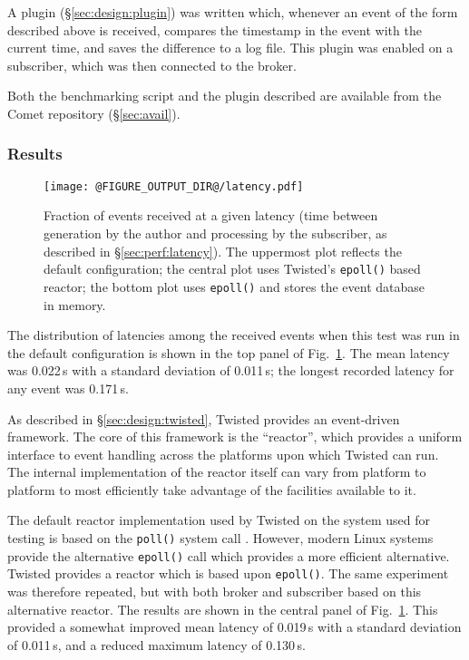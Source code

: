 \documentclass[5p,authoryear]{elsarticle}
\begin{document}
A plugin (\S\ref{sec:design:plugin}) was written which, whenever an event of
the form described above is received, compares the timestamp in the event with
the current time, and saves the difference to a log file. This plugin was
enabled on a subscriber, which was then connected to the broker.

Both the benchmarking script and the plugin described are available from the
Comet repository (\S\ref{sec:avail}).

\subsubsection{Results}
\label{sec:perf:latency:results}

\begin{figure}
  \begin{center}
  \texttt{[image: @FIGURE\_OUTPUT\_DIR@/latency.pdf]}
  \end{center}

  \caption{Fraction of events received at a given latency (time between
  generation by the author and processing by the subscriber, as described in
  \S\ref{sec:perf:latency}). The uppermost plot reflects the default
  configuration; the central plot uses Twisted's \texttt{epoll()} based
  reactor; the bottom plot uses \texttt{epoll()} and stores the event database
  in memory.}

  \label{fig:latency}
\end{figure}

The distribution of latencies among the received events when this test was run
in the default configuration is shown in the top panel of
Fig.~\ref{fig:latency}. The mean latency was 0.022\,s with a standard
deviation of 0.011\,s; the longest recorded latency for any event was
0.171\,s.

As described in \S\ref{sec:design:twisted}, Twisted provides an event-driven
framework. The core of this framework is the ``reactor'', which provides a
uniform interface to event handling across the platforms upon which Twisted
can run. The internal implementation of the reactor itself can vary from
platform to platform to most efficiently take advantage of the facilities
available to it.

The default reactor implementation used by Twisted on the system used for
testing is based on the \texttt{poll()} system call \citep{Posix1:2013}.
However, modern Linux systems provide the alternative \texttt{epoll()} call
\citep{Kerrisk:2014} which provides a more efficient alternative. Twisted
provides a reactor which is based upon \texttt{epoll()}. The same experiment
was therefore repeated, but with both broker and subscriber based on this
alternative reactor. The results are shown in the central panel of
Fig.~\ref{fig:latency}. This provided a somewhat improved mean latency of
0.019\,s with a standard deviation of 0.011\,s, and a reduced maximum latency
of 0.130\,s.
\end{document}
